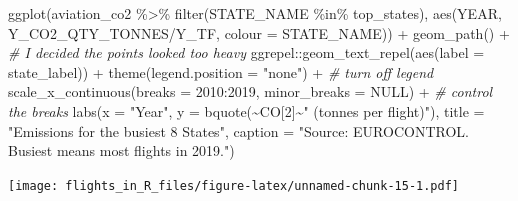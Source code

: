 \documentclass[
]{book}
\newenvironment{Shaded}{\begin{snugshade}}{\end{snugshade}}
\newcommand{\AttributeTok}[1]{\textcolor[rgb]{0.77,0.63,0.00}{#1}}
\newcommand{\CommentTok}[1]{\textcolor[rgb]{0.56,0.35,0.01}{\textit{#1}}}
\newcommand{\ConstantTok}[1]{\textcolor[rgb]{0.00,0.00,0.00}{#1}}
\newcommand{\DecValTok}[1]{\textcolor[rgb]{0.00,0.00,0.81}{#1}}
\newcommand{\FunctionTok}[1]{\textcolor[rgb]{0.00,0.00,0.00}{#1}}
\newcommand{\NormalTok}[1]{#1}
\newcommand{\SpecialCharTok}[1]{\textcolor[rgb]{0.00,0.00,0.00}{#1}}
\newcommand{\StringTok}[1]{\textcolor[rgb]{0.31,0.60,0.02}{#1}}
\begin{document}
\begin{Shaded}
\begin{Highlighting}[]
\FunctionTok{ggplot}\NormalTok{(aviation\_co2 }\SpecialCharTok{\%\textgreater{}\%} 
         \FunctionTok{filter}\NormalTok{(STATE\_NAME }\SpecialCharTok{\%in\%}\NormalTok{ top\_states), }
       \FunctionTok{aes}\NormalTok{(YEAR, Y\_CO2\_QTY\_TONNES}\SpecialCharTok{/}\NormalTok{Y\_TF, }
           \AttributeTok{colour =}\NormalTok{ STATE\_NAME)) }\SpecialCharTok{+}
  \FunctionTok{geom\_path}\NormalTok{() }\SpecialCharTok{+} \CommentTok{\# I decided the points looked too heavy}
\NormalTok{  ggrepel}\SpecialCharTok{::}\FunctionTok{geom\_text\_repel}\NormalTok{(}\FunctionTok{aes}\NormalTok{(}\AttributeTok{label =}\NormalTok{ state\_label)) }\SpecialCharTok{+}
  \FunctionTok{theme}\NormalTok{(}\AttributeTok{legend.position =} \StringTok{"none"}\NormalTok{) }\SpecialCharTok{+}  \CommentTok{\# turn off legend}
  \FunctionTok{scale\_x\_continuous}\NormalTok{(}\AttributeTok{breaks =} \DecValTok{2010}\SpecialCharTok{:}\DecValTok{2019}\NormalTok{, }\AttributeTok{minor\_breaks =} \ConstantTok{NULL}\NormalTok{) }\SpecialCharTok{+} \CommentTok{\# control the breaks}
  \FunctionTok{labs}\NormalTok{(}\AttributeTok{x =} \StringTok{"Year"}\NormalTok{, }
       \AttributeTok{y =} \FunctionTok{bquote}\NormalTok{(}\SpecialCharTok{\textasciitilde{}}\NormalTok{CO[}\DecValTok{2}\NormalTok{]}\SpecialCharTok{\textasciitilde{}}\StringTok{" (tonnes per flight)"}\NormalTok{),}
       \AttributeTok{title =} \StringTok{"Emissions for the busiest 8 States"}\NormalTok{,}
       \AttributeTok{caption =} \StringTok{"Source: EUROCONTROL. \textquotesingle{}Busiest\textquotesingle{} means most flights in 2019."}\NormalTok{)}
\end{Highlighting}
\end{Shaded}

\texttt{[image: flights\_in\_R\_files/figure-latex/unnamed-chunk-15-1.pdf]}

  
\end{document}
